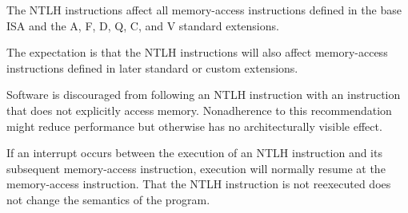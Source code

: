 The NTLH instructions affect all memory-access instructions defined in the
base ISA and the A, F, D, Q, C, and V standard extensions.

\begin{commentary}
The expectation is that the NTLH instructions will also affect memory-access
instructions defined in later standard or custom extensions.
\end{commentary}

Software is discouraged from following an NTLH instruction with an
instruction that does not explicitly access memory.
Nonadherence to this recommendation might reduce performance but
otherwise has no architecturally visible effect.

\begin{commentary}
If an interrupt occurs between the execution of an NTLH instruction and its
subsequent memory-access instruction, execution will normally resume at the
memory-access instruction.
That the NTLH instruction is not reexecuted does not change the semantics of
the program.
\end{commentary}

